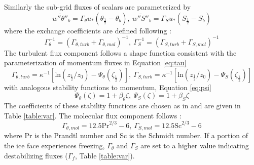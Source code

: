 \documentclass[draft]{agujournal2019}
\begin{document}
Similarly the sub-grid fluxes of scalars are parameterized by
\begin{equation} \label{eq:melt_flux}
    \overline{w''\theta''}_b = \Gamma_{\theta} u_* \left(\theta_{\frac{1}{2}} - \theta_b\right),\: 
    \overline{w''S''}_b = \Gamma_S u_* \left(S_{\frac{1}{2}} - S_b\right)
\end{equation}
%
where the exchange coefficients are defined following \cite{mcphee_dynamics_1987}:
\begin{equation} \label{eq:gamma}
    \Gamma_{\theta}^{-1} = \left(\Gamma_{\theta,turb} + \Gamma_{\theta,mol}\right)^{-1},\:
    \Gamma_S^{-1} = \left(\Gamma_{S,turb} + \Gamma_{S,mol}\right)^{-1}
\end{equation}
%
The turbulent flux component follows a shape function consistent with the parameterization of momentum fluxes in Equation \ref{eq:tau}
\begin{equation} \label{eq:gamma_turb}
    \Gamma_{\theta,turb} = \kappa^{-1} \left[\textrm{ln}\left(z_{\frac{1}{2}}/z_0\right) - \Psi_{\theta}\left(\zeta_{\frac{1}{2}}\right)\right], \:
    \Gamma_{S,turb} = \kappa^{-1} \left[\textrm{ln}\left(z_{\frac{1}{2}}/z_0\right) - \Psi_S\left(\zeta_{\frac{1}{2}}\right)\right]    %
\end{equation}
with analogous stability functions to momentum, Equation \ref{eq:psi}
\begin{equation}
    \Psi_{\theta}(\zeta) = 1 + \beta_{\theta}\zeta, \:
    \Psi_{S}(\zeta) = 1 + \beta_{S}\zeta
\end{equation}
The coefficients of these stability functions are chosen as in  and are given in Table \ref{table:var}. The molecular flux component follows :
\begin{equation}
    \Gamma_{\theta,mol} = 12.5 \textrm{Pr}^{2/3} - 6, \:
    \Gamma_{S,mol} = 12.5 \textrm{Sc}^{2/3} - 6
\end{equation}
where Pr is the Prandtl number and Sc is the Schmidt number. If a portion of the ice face experiences freezing, $\Gamma_\theta$ and $\Gamma_S$ are set to a higher value indicating destabilizing fluxes ($\Gamma_{f}$, Table \ref{table:var}).
\end{document}
